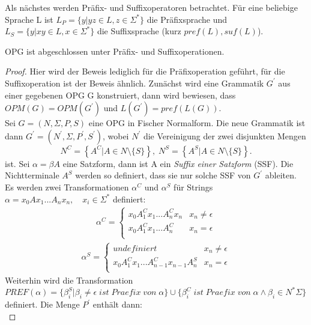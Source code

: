 Als nächstes werden Präfix- und Suffixoperatoren betrachtet. Für eine beliebige Sprache L ist $L_P=\{y|yz \in L, z\in \Sigma^*\}$ die Präfixsprache und $L_S=\{y|xy \in L, x \in \Sigma^*\}$ die Suffixsprache (kurz $pref(L), suf(L)$).
\begin{theorem}
OPG ist abgeschlossen unter Präfix- und Suffixoperationen.
\end{theorem}
\begin{proof}
Hier wird der Beweis lediglich für die Präfixoperation geführt, für die Suffixoperation ist der Beweis ähnlich. Zunächst wird eine Grammatik $G^\prime$ aus einer gegebenen OPG G konstruiert, dann wird bewiesen, dass $OPM(G)=OPM(G^\prime)$ und $L(G^\prime)=pref(L(G))$.\\
Sei $G=(N, \Sigma, P, S)$ eine OPG in Fischer Normalform. Die neue Grammatik ist dann $G^\prime = (N^\prime, \Sigma, P^\prime, S^\prime)$, wobei $N^\prime$ die Vereinigung der zwei disjunkten Mengen
\begin{equation*}
N^C=\left\{A^C|A\in N \setminus \{S\} \right\}, \;
N^S=\left\{A^S|A\in N \setminus \{S\} \right\}.
\end{equation*}
ist. Sei $\alpha = \beta A$ eine Satzform, dann ist A ein \textit{Suffix einer Satzform} (SSF). Die Nichtterminale $A^S$ werden so definiert, dass sie nur solche SSF von $G^\prime$ ableiten. Es werden zwei Transformationen $\alpha^C$ und $\alpha^S$ für Strings $\alpha=x_0Ax_1...A_nx_n, \quad x_i \in \Sigma^*$ definiert: 
\begin{align*}
\alpha^C =  \begin{cases}
x_0 A_1^Cx_1...A_n^Cx_n & x_n \neq \epsilon \\
x_0 A_1^Cx_1...A_n^C & x_n = \epsilon \\
\end{cases}
\end{align*}
\begin{align*}
\alpha^S =  \begin{cases}
undefiniert & x_n \neq \epsilon \\
x_0 A_1^Cx_1...A_{n-1}^Cx_{n-1}A_n^S & x_n = \epsilon \\
\end{cases}
\end{align*}
Weiterhin wird die Transformation $PREF(\alpha) = \{\beta_i^S|\beta_i \neq \epsilon \;ist\; Praefix\; von\; \alpha\} \cup \{\beta_i^C \;ist \;Praefix\; von\; \alpha \wedge \beta_i \in N^*\Sigma\}$ definiert. Die Menge $P^\prime$ enthält dann: \\
\begin{equation*}

\end{equation*}
\end{proof}
